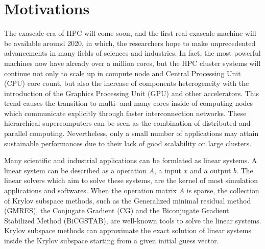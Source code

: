 \section{Motivations}

The exascale era of HPC will come soon, and the first real exascale machine will be available around 2020, in which, the researchers hope to make unprecedented advancements in many fields of sciences and industries. In fact, the most powerful machines now have already over a million cores, but the HPC cluster systems will continue not only to scale up in compute node and Central Processing Unit (CPU) core count, but also the increase of components heterogeneity with the introduction of the Graphics Processing Unit (GPU) and other accelerators. This trend causes the transition to multi- and many cores inside of computing nodes which communicate explicitly through faster interconnection networks. These hierarchical supercomputers can be seen as the combination of distributed and parallel computing. Nevertheless, only a small number of applications may attain sustainable performances due to their lack of good scalability on large clusters. 

Many scientific and industrial applications can be formlated as linear systems. A linear system can be described as a operation $A$, a input $x$ and a output $b$. The linear solvers which aim to solve these systems, are the kernel of most simulation applications and softwares. When the operation matrix $A$ is sparse, the collection of Krylov subspace methods, such as the Generalized minimal residual method (GMRES), the Conjugate Gradient (CG)  and the Biconjugate Gradient Stabilized Method (BiCGSTAB), are well-known tools to solve the linear systems. Krylov subspace methods can approximate the exact solution of linear systems inside the Krylov subspace starting from a given initial guess vector. 

